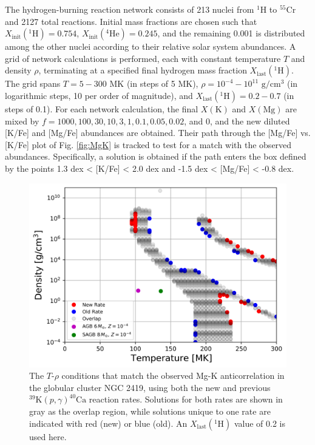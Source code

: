 The hydrogen-burning reaction network consists of 213 nuclei from $^{1}$H to $^{55}$Cr and 2127 total reactions. Initial mass fractions are chosen such that $X_{\mathrm{init}}(^{1}\mathrm{H}) = 0.754$, $X_{\mathrm{init}}(^{4}\mathrm{He}) = 0.245$, and the remaining 0.001 is distributed among the other nuclei according to their relative solar system abundances. A grid of network calculations is performed, each with constant temperature $T$ and density $\rho$, terminating at a specified final hydrogen mass fraction $X_{\mathrm{last}}(^{1}\mathrm{H})$. The grid spans $T=5-300$ MK (in steps of 5 MK), $\rho=10^{-4}-10^{11}$ $\mathrm{g}/\mathrm{cm}^{3}$ (in logarithmic steps, 10 per order of magnitude), and $X_{\mathrm{last}}(^{1}\mathrm{H}) = 0.2-0.7$ (in steps of 0.1). For each network calculation, the final $X(\mathrm{K})$ and $X(\mathrm{Mg})$ are mixed by $f = 1000, 100, 30, 10, 3, 1, 0.1, 0.05, 0.02$, and $0$, and the new diluted [K/Fe] and [Mg/Fe] abundances are obtained. Their path through the [Mg/Fe] vs. [K/Fe] plot of Fig. \ref{fig:MgK} is tracked to test for a match with the observed abundances. Specifically, a solution is obtained if the path enters the box defined by the points 1.3 dex < [K/Fe] < 2.0 dex and -1.5 dex < [Mg/Fe] < -0.8 dex.

\begin{figure}[!p]
\includegraphics[width=6.5in]{Chapter-6/figs/MgK_xlast20.png}
\caption{\label{fig:MgK_Trho_Conditions}The $T$-$\rho$ conditions that match the observed Mg-K anticorrelation in the globular cluster NGC 2419, using both the new and previous $^{39}\mathrm{K}(p,\gamma)^{40}\mathrm{Ca}$ reaction rates. Solutions for both rates are shown in gray as the overlap region, while solutions unique to one rate are indicated with red (new) or blue (old). An $X_{\mathrm{last}}(^{1}\mathrm{H})$ value of 0.2 is used here.}
\end{figure}


